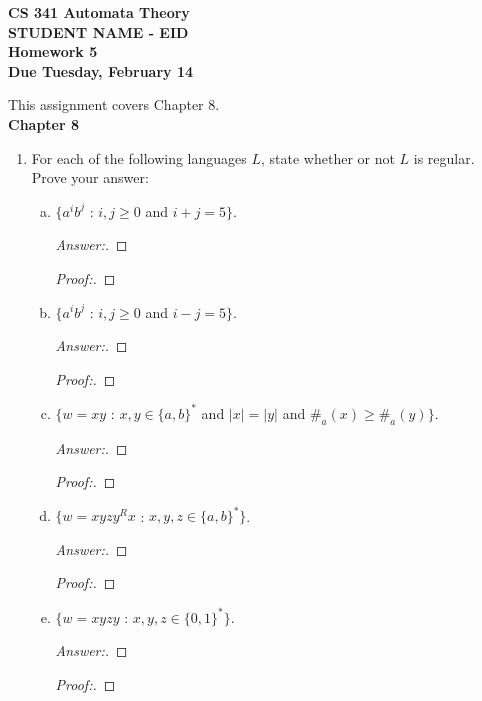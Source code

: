 \documentclass[10pt]{article}
\newcommand{\card}[1]{\left| #1 \right|}
\begin{document}
\begin{flushleft}
\textbf{\noindent
CS 341 Automata Theory \\
STUDENT NAME - EID \\
Homework 5 \\
Due Tuesday, February 14}\\
\end{flushleft}
\noindent
This assignment covers Chapter 8. \\

\noindent
\textbf{Chapter 8}
\begin{enumerate}[1)]

\item
For each of the following languages $L$, state whether or not $L$ is regular.  Prove your answer:
\begin{enumerate}[a)]
\item
$\{a^ib^j$ : $i, j \geq 0$ and $i + j = 5\}$.
\begin{proof}[Answer:]
\end{proof}
\begin{proof}[Proof:]
\end{proof}

\item
$\{a^ib^j$ : $i, j \geq 0$ and $i - j = 5\}$.
\begin{proof}[Answer:]
\end{proof}
\begin{proof}[Proof:]
\end{proof}

\item
$\{w = xy$ : $x, y \in \{a, b\}^*$ and $\card{x} = \card{y}$ and $\#_a(x) \geq \#_a(y)\}$.
\begin{proof}[Answer:]
\end{proof}
\begin{proof}[Proof:]
\end{proof}

\item
$\{w = xyzy^Rx$ : $x, y, z \in \{a, b\}^*\}$.
\begin{proof}[Answer:]
\end{proof}
\begin{proof}[Proof:]
\end{proof}

\item
$\{w = xyzy$ : $x, y, z \in \{0, 1\}^*\}$.
\begin{proof}[Answer:]
\end{proof}
\begin{proof}[Proof:]
\end{proof}


\end{enumerate}
\end{enumerate}
\end{document}
